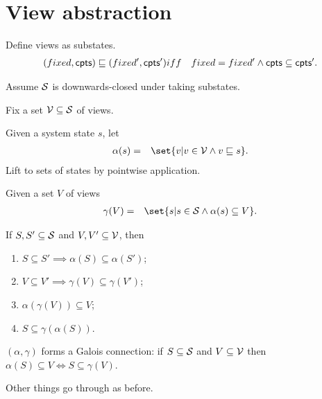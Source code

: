 
\section{View abstraction}

Define views as substates.
\begin{eqnarray*}
(\fixed, \cpt ) \sqle (\fixed', \cpt') & iff & 
  \fixed = \fixed' \land \cpt \subseteq \cpt' .
\end{eqnarray*}

Assume $\S$ is downwards-closed under taking substates. 

Fix a set $\V \subseteq \S$ of views.

Given a system state $s$, let
%
\begin{eqnarray*}
\alpha(s) & = &
  \set{ v | v \in \V \land v \sqle s}.
\end{eqnarray*}
%
Lift to sets of states by pointwise application. 

Given a set $V$ of views
\begin{eqnarray*}
\gamma(V) & = &   \set{ s | s \in \S \land \alpha(s) \subseteq V }.
\end{eqnarray*}



\begin{lemma}
If $S, S' \subseteq \S$ and $V, V' \subseteq \V$, then
\begin{enumerate}
\item $S \subseteq S' \implies \alpha(S) \subseteq \alpha(S')$;

\item $V \subseteq V' \implies \gamma(V) \subseteq \gamma(V')$;

\item $\alpha(\gamma(V)) \subseteq V$;

\item $S \subseteq \gamma(\alpha(S))$.
\end{enumerate}
\end{lemma}
%



\begin{lemma}
$(\alpha, \gamma)$ forms a Galois connection: if $S \subseteq \S$ and $V
  \subseteq \V$ then $\alpha(S) \subseteq V \iff S \subseteq \gamma(V)$.
\end{lemma}
%



Other things go through as before.  

